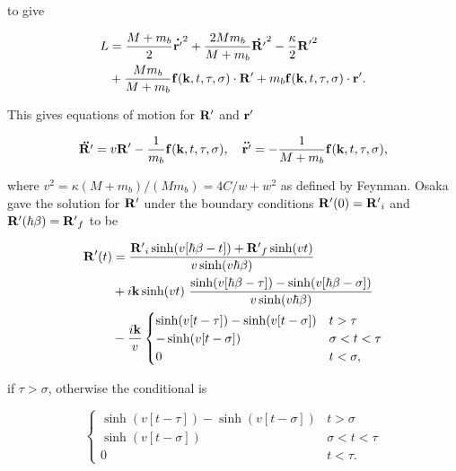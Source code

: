 to give

\begin{equation}
    \begin{aligned}
        L &= \frac{M+m_b}{2} \vb{\dot{r'}}^2 + \frac{2M m_b}{M+m_b} \vb{\dot{R'}}^2 - \frac{\kappa}{2}\vb{R'}^2 \\
        &+\frac{M m_b}{M+m_b} \vb{f}(\vb{k}, t, \tau, \sigma) \cdot \vb{R'} + m_b \vb{f}(\vb{k}, t, \tau, \sigma) \cdot \vb{r'}.
    \end{aligned}
\end{equation}

This gives equations of motion for $\vb{R'}$ and $\vb{r'}$

\begin{equation}\label{eqn:osaka_rel}
    \vb{\ddot{R'}} = v\vb{R'} - \frac{1}{m_b} \vb{f}(\vb{k}, t, \tau, \sigma), \quad \vb{\ddot{r'}} = -\frac{1}{M+m_b} \vb{f}(\vb{k}, t, \tau, \sigma),
\end{equation}

where $v^2 = \kappa (M+m_b) / (M m_b) = 4C/w + w^2$ as defined by Feynman. Osaka gave the solution for $\vb{R'}$ under the boundary conditions $\vb{R'}(0) = \vb{R'}_i$ and $\vb{R'}(\hbar \beta) = \vb{R'}_f$ to be

\begin{equation}
    \begin{aligned}
    \vb{R'}(t) &= \frac{\vb{R'}_i \sinh (v[\hbar\beta - t]) + \vb{R'}_f \sinh(vt)}{v\sinh(v\hbar\beta)} \\
    &+ i\vb{k} \sinh(vt)\ \frac{\sinh(v[\hbar\beta - \tau]) - \sinh(v[\hbar\beta - \sigma])}{v\sinh(v\hbar\beta)} \\
    &- \frac{i\vb{k}}{v}
    \begin{cases}
        \sinh(v[t-\tau]) - \sinh(v[t-\sigma]) & t > \tau \\
        -\sinh(v[t-\sigma]) & \sigma < t < \tau \\
        0 & t < \sigma,
    \end{cases}
    \end{aligned}
\end{equation}

if $\tau > \sigma$, otherwise the conditional is

\begin{equation}
    \begin{cases}
        \sinh(v[t-\tau]) - \sinh(v[t-\sigma]) & t > \sigma \\
        \sinh(v[t-\sigma]) & \sigma < t < \tau \\
        0 & t < \tau.
    \end{cases}
\end{equation}

